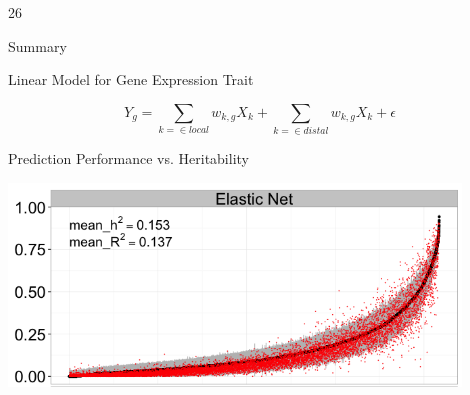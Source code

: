\documentclass[final]{beamer}
\newcommand{\ColWidth}{26}
\begin{document}
\begin{frame}{}
\begin{textblock}{\ColWidth}
\begin{block}{Summary}
\begin{footnotesize}
\end{footnotesize}
\end{block}

\begin{block}{Linear Model for Gene Expression Trait}

\[ Y_g = \sum_{k = \in local}w_{k,g} X_k + \sum_{k = \in distal}w_{k,g} X_k + \epsilon \]

\end{block}

\begin{block}{Prediction Performance vs. Heritability}
	\begin{center}
	\begin{center}
		\includegraphics[width=0.9\textwidth]{plots/Fig3_compareR2_h2_en.png}
	\end{center}
	\end{center}

\bigskip

\end{block}


\end{textblock}
\end{frame}
\end{document}

